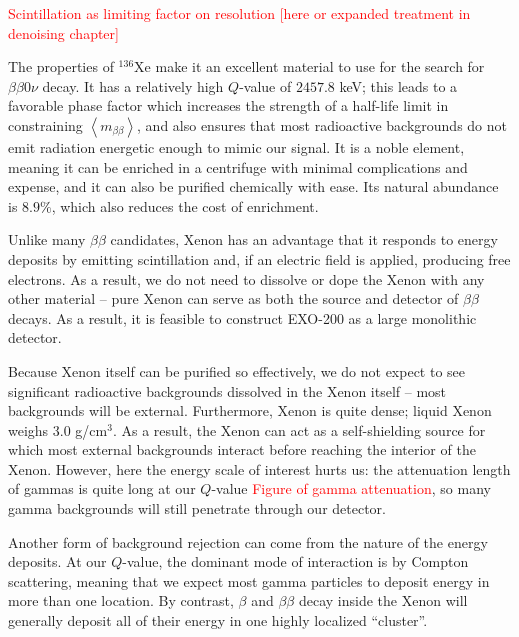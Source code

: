\textcolor{red}{Scintillation as limiting factor on resolution [here or expanded treatment in denoising chapter]}








The properties of $^{136}$Xe make it an excellent material to use for the search for $\beta\beta 0\nu$ decay.  It has a relatively high $Q$-value of $2457.8$ keV; this leads to a favorable phase factor which increases the strength of a half-life limit in constraining $\left<m_{\beta\beta}\right>$, and also ensures that most radioactive backgrounds do not emit radiation energetic enough to mimic our signal.  It is a noble element, meaning it can be enriched in a centrifuge with minimal complications and expense, and it can also be purified chemically with ease.  Its natural abundance is $8.9\%$, which also reduces the cost of enrichment.

Unlike many $\beta\beta$ candidates, Xenon has an advantage that it responds to energy deposits by emitting scintillation and, if an electric field is applied, producing free electrons.  As a result, we do not need to dissolve or dope the Xenon with any other material -- pure Xenon can serve as both the source and detector of $\beta\beta$ decays.  As a result, it is feasible to construct EXO-200 as a large monolithic detector.

Because Xenon itself can be purified so effectively, we do not expect to see significant radioactive backgrounds dissolved in the Xenon itself -- most backgrounds will be external.  Furthermore, Xenon is quite dense; liquid Xenon weighs $3.0$ g/cm$^3$.  As a result, the Xenon can act as a self-shielding source for which most external backgrounds interact before reaching the interior of the Xenon.  However, here the energy scale of interest hurts us:  the attenuation length of gammas is quite long at our $Q$-value \textcolor{red}{Figure of gamma attenuation}, so many gamma backgrounds will still penetrate through our detector.

Another form of background rejection can come from the nature of the energy deposits.  At our $Q$-value, the dominant mode of interaction is by Compton scattering, meaning that we expect most gamma particles to deposit energy in more than one location.  By contrast, $\beta$ and $\beta\beta$ decay inside the Xenon will generally deposit all of their energy in one highly localized ``cluster''.

